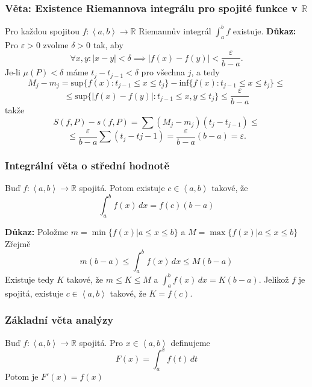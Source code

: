 \documentclass[../main.tex]{subfiles}
\begin{document}
\subsubsection{Věta: Existence Riemannova integrálu pro spojité funkce v $\mathbb{R}$}
\hspace{1.2mm}
Pro každou spojitou $f : \left<a,b\right> \rightarrow \mathbb{R}$ Riemannův integrál $\int^b_a f$ existuje.
\vspace{5mm}
\noindent
\textbf{Důkaz:} Pro $\varepsilon > 0 $ zvolme $\delta > 0$ tak, aby 
\[\forall x,y : |x-y| < \delta \implies |f(x) - f(y)| < \frac{\varepsilon}{b-a}.\]
Je-li $\mu(P) < \delta$ máme $t_j-t_{j-1} < \delta$ pro všechna $j$, a tedy
\[M_j - m_j = \text{sup}\{f(x) : t_{j-1} \leq x \leq t_j\} - \text{inf}\{f(x) : t_{j-1} \leq x \leq t_j\} \leq\]
\[\leq \text{sup}\{|f(x) - f(y)| : t_{j-1} \leq x,y \leq t_j\} \leq \frac{\varepsilon}{b-a}\]
takže
\[S(f,P) - s(f,P) = \sum (M_j - m_j)(t_j-t_{j-1})\leq\]
\[\leq \frac{\varepsilon}{b-a}\sum (t_j-t{j-1}) = \frac{\varepsilon}{b-a}(b-a) = \varepsilon.\]

\subsubsection{Integrální věta o střední hodnotě}
\hspace{1.2mm}
Buď $f: \left< a,b \right> \to \mathbb{R}$ spojitá. Potom existuje $c \in \left< a,b \right>$
takové, že
\[ \int_{a}^{b} f(x) \,dx = f(c)(b-a)\]

\vspace{5mm}
\noindent
\textbf{Důkaz:} Položme $m = \min \{ f(x)|a \leq x \leq b \}$ a $M = \max \{ f(x)|a \leq x \leq b \} $
Zřejmě
\[ m(b-a) \leq \int_{a}^{b} f(x) \,dx \leq M(b-a) \]
Existuje tedy $K$ takové, že $m \leq K \leq M$ a $\int_{a}^{b} f(x) \,dx = K(b-a)$.
Jelikož $f$ je spojitá, existuje $c \in \left< a,b \right>$ takové, že $K = f(c)$.

\subsubsection{Základní věta analýzy}
\hspace{1.2mm}
Buď $f: \left< a,b \right> \to \mathbb{R}$ spojitá. Pro $x \in \left< a,b \right>$ definujeme
\[ F(x) = \int_{a}^{x} f(t) \,dt \]
Potom je $F'(x) = f(x)$
\end{document}
